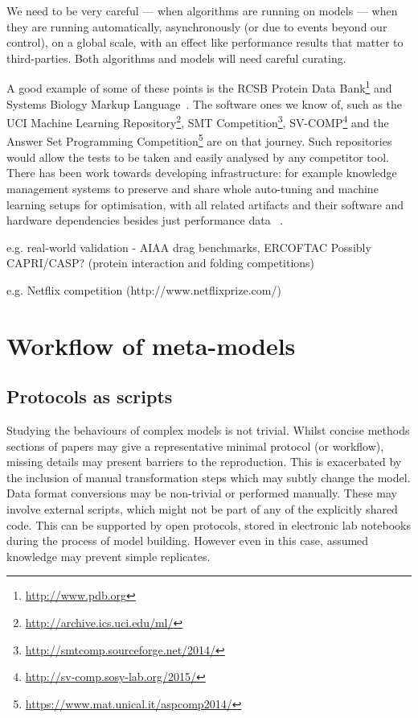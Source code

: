 \documentclass[conference]{IEEEtran}
\begin{document}
We need to be very careful --- when algorithms are running on models --- when
they are running automatically, asynchronously (or due to events beyond our
control), on a global scale, with an effect like performance results that
matter to third-parties. Both algorithms and  models will need careful
curating.

A good example of some of these points is the RCSB Protein Data
Bank\footnote{\url{http://www.pdb.org}} and Systems Biology Markup
Language~\cite{Hucka2003,Chaouiya2013}. The software ones we know of,
such as the UCI Machine Learning
Repository\footnote{\url{http://archive.ics.uci.edu/ml/}}, SMT
Competition\footnote{\url{http://smtcomp.sourceforge.net/2014/}},
SV-COMP\footnote{\url{http://sv-comp.sosy-lab.org/2015/}} and the
Answer Set Programming
Competition\footnote{\url{https://www.mat.unical.it/aspcomp2014/}} are
on that journey. Such repositories would allow the tests to be taken
and easily analysed by any competitor tool. There has been work
towards developing infrastructure: for example knowledge management
systems to preserve and share whole auto-tuning and machine learning
setups for optimisation, with all related artifacts and their software
and hardware dependencies besides just performance data
~\cite{fursin-et-al:2014}.


e.g. real-world validation - AIAA drag benchmarks, ERCOFTAC
	Possibly CAPRI/CASP? (protein interaction and folding competitions)

e.g. Netflix competition (http://www.netflixprize.com/)


\section{Workflow of meta-models}

\subsection{Protocols as scripts}

Studying the behaviours of complex models is not trivial. Whilst 
concise methods sections of papers may give a representative minimal
protocol (or workflow), missing details may present barriers to 
the reproduction. This is exacerbated by the inclusion of manual 
transformation steps which may subtly change the model. Data format 
conversions may be non-trivial or performed manually. These may 
involve external scripts, which might not be part of any of the
explicitly shared code. This can be supported by open protocols, stored 
in electronic lab notebooks during the process of model building. However
even in this case, assumed knowledge may prevent simple replicates.
\end{document}
